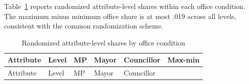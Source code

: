 \documentclass[
  letterpaper,
  DIV=11,
  numbers=noendperiod]{scrartcl}
\begin{document}
Table~\ref{tbl-balance} reports randomized attribute-level shares within
each office condition. The maximum minus minimum office share is at most
.019 across all levels, consistent with the common randomization scheme.

\begin{longtable}[]{@{}
  >{\raggedright\arraybackslash}p{}
  >{\raggedright\arraybackslash}p{}
  >{\raggedleft\arraybackslash}p{}
  >{\raggedleft\arraybackslash}p{}
  >{\raggedleft\arraybackslash}p{}
  >{\raggedleft\arraybackslash}p{}@{}}
\caption{Randomized attribute-level shares by office
condition}\label{tbl-balance}\tabularnewline
\toprule\noalign{}
\begin{minipage}[b]{\linewidth}\raggedright
Attribute
\end{minipage} & \begin{minipage}[b]{\linewidth}\raggedright
Level
\end{minipage} & \begin{minipage}[b]{\linewidth}\raggedleft
MP
\end{minipage} & \begin{minipage}[b]{\linewidth}\raggedleft
Mayor
\end{minipage} & \begin{minipage}[b]{\linewidth}\raggedleft
Councillor
\end{minipage} & \begin{minipage}[b]{\linewidth}\raggedleft
Max-min
\end{minipage} \\
\midrule\noalign{}
\endfirsthead
\toprule\noalign{}
\begin{minipage}[b]{\linewidth}\raggedright
Attribute
\end{minipage} & \begin{minipage}[b]{\linewidth}\raggedright
Level
\end{minipage} & \begin{minipage}[b]{\linewidth}\raggedleft
MP
\end{minipage} & \begin{minipage}[b]{\linewidth}\raggedleft
Mayor
\end{minipage} & \begin{minipage}[b]{\linewidth}\raggedleft
Councillor
\end{minipage} & \begin{minipage}[b]{\linewidth}\raggedleft

\end{minipage}
\end{longtable}
\end{document}
